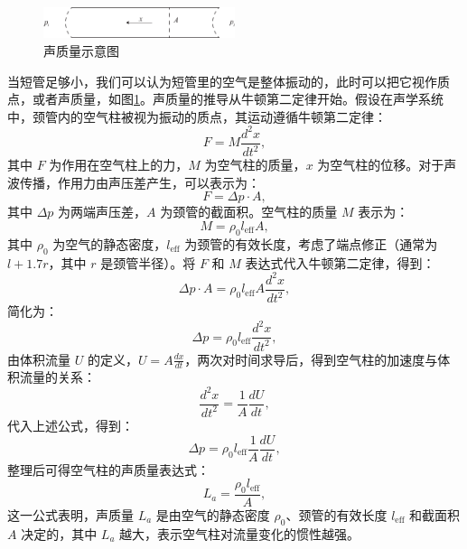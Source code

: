 \begin{figure}[h!]
  \centering
  \includegraphics[width=0.5\textwidth]{images/fig2-2.eps} 
  \caption{声质量示意图 }
  \label{fig_2_2}
\end{figure}

当短管足够小，我们可以认为短管里的空气是整体振动的，此时可以把它视作质点，或者声质量，如图\ref{fig_2_2}。声质量的推导从牛顿第二定律开始。假设在声学系统中，颈管内的空气柱被视为振动的质点，其运动遵循牛顿第二定律：
\begin{equation} \label{eq2-11}
  F = M \frac{d^2 x}{dt^2},
\end{equation}
其中 \( F \) 为作用在空气柱上的力，\( M \) 为空气柱的质量，\( x \) 为空气柱的位移。对于声波传播，作用力由声压差产生，可以表示为：
\begin{equation} \label{eq2-12}
  F = \Delta p \cdot A,
\end{equation}
其中 \( \Delta p \) 为两端声压差，\( A \) 为颈管的截面积。空气柱的质量 \( M \) 表示为：
\begin{equation} \label{eq2-13}
  M = \rho_0 l_{\text{eff}} A,
\end{equation}
其中 \( \rho_0 \) 为空气的静态密度，\( l_{\text{eff}} \) 为颈管的有效长度，考虑了端点修正（通常为 \( l + 1.7r \)，其中 \( r \) 是颈管半径）。将 \( F \) 和 \( M \) 表达式代入牛顿第二定律，得到：
\begin{equation} \label{eq2-14}
  \Delta p \cdot A = \rho_0 l_{\text{eff}} A \frac{d^2 x}{dt^2},
\end{equation}
简化为：
\begin{equation} \label{eq2-15}
  \Delta p = \rho_0 l_{\text{eff}} \frac{d^2 x}{dt^2},
\end{equation}
由体积流量 \( U \) 的定义，\( U = A \frac{dx}{dt} \)，两次对时间求导后，得到空气柱的加速度与体积流量的关系：
\begin{equation} \label{eq2-16}
  \frac{d^2 x}{dt^2} = \frac{1}{A} \frac{dU}{dt},
\end{equation}
代入上述公式，得到：
\begin{equation} \label{eq2-17}
  \Delta p = \rho_0 l_{\text{eff}} \frac{1}{A} \frac{dU}{dt},
\end{equation}
整理后可得空气柱的声质量表达式：
\begin{equation} \label{eq2-18}
  L_a = \frac{\rho_0 l_{\text{eff}}}{A},
\end{equation}
这一公式表明，声质量 \( L_a \) 是由空气的静态密度 \(\rho_0\)、颈管的有效长度 \(l_{\text{eff}}\) 和截面积 \(A\) 决定的，其中 \( L_a \) 越大，表示空气柱对流量变化的惯性越强。

